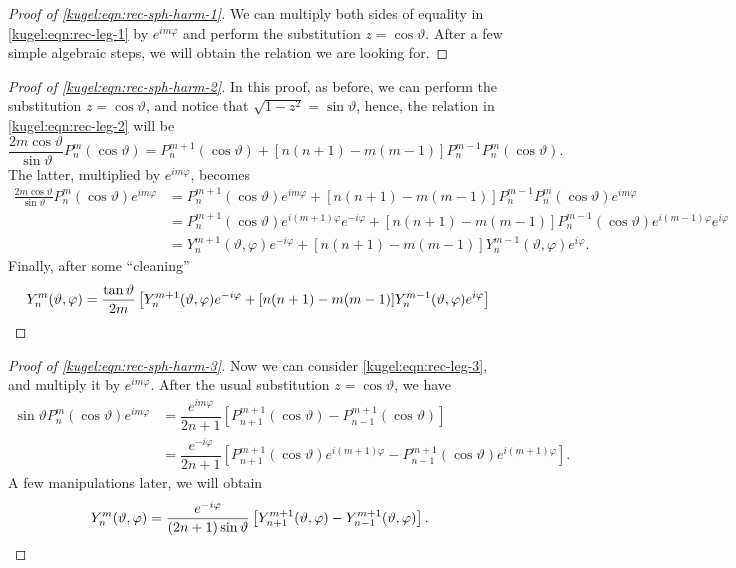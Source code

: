 \begin{proof}[Proof of \eqref{kugel:eqn:rec-sph-harm-1}]
  We can multiply both sides of equality in \eqref{kugel:eqn:rec-leg-1} by $e^{im
  \varphi}$ and perform the substitution $z=\cos \vartheta$. After a few simple
  algebraic steps, we will obtain the relation we are looking for.
\end{proof}

\begin{proof}[Proof of \eqref{kugel:eqn:rec-sph-harm-2}]
  In this proof, as before, we can perform the substitution $z=\cos \vartheta$,
  and notice that $\sqrt{1-z^2}=\sin \vartheta$, hence, the relation in
  \eqref{kugel:eqn:rec-leg-2} will be
  \begin{equation*}
    \frac{2m \cos \vartheta}{\sin \vartheta} P^m_n(\cos \vartheta) 
    = P^{m+1}_n(\cos \vartheta) + [n(n+1)-m(m-1)]P^{m-1}_n P^m_n(\cos \vartheta).
  \end{equation*}
  The latter, multiplied by $e^{im\varphi}$, becomes
  \begin{align*}
    \frac{2m \cos \vartheta}{\sin \vartheta} P^m_n(\cos \vartheta)e^{im\varphi}
      &= P^{m+1}_n(\cos \vartheta)e^{im\varphi}
       + [n(n+1)-m(m-1)]P^{m-1}_n P^m_n(\cos \vartheta)e^{im\varphi} \\
      &= P^{m+1}_n(\cos \vartheta)e^{i(m+1)\varphi}e^{-i\varphi}
       + [n(n+1)-m(m-1)]P^{m-1}_n (\cos \vartheta)e^{i(m-1)\varphi}e^{i\varphi} \\
      &= Y^{m+1}_n(\vartheta, \varphi)e^{-i\varphi}
       + [n(n+1)-m(m-1)]Y^{m-1}_n(\vartheta, \varphi)e^{i\varphi}.
  \end{align*}
  Finally, after some ``cleaning''
  \begin{equation*}
    Y^m_n(\vartheta, \varphi) = \frac{\tan \vartheta}{2m} \left[
      Y^{m+1}_n(\vartheta, \varphi)e^{-i\varphi}
      + [n(n+1)-m(m-1)]Y^{m-1}_n(\vartheta, \varphi)e^{i\varphi}
    \right]
    \qedhere
  \end{equation*}
\end{proof}

\begin{proof}[Proof of \eqref{kugel:eqn:rec-sph-harm-3}]
  Now we can consider \eqref{kugel:eqn:rec-leg-3}, and multiply it by
  $e^{im\varphi}$. After the usual substitution $z=\cos \vartheta$, we have 
  \begin{align*}
    \sin \vartheta P^m_n(\cos \vartheta)e^{im\varphi}
      &= \dfrac{e^{im\varphi}}{2n+1}\left[
          P^{m+1}_{n+1}(\cos \vartheta)
          - P^{m+1}_{n-1}(\cos \vartheta)
        \right] \\
      &= \dfrac{e^{-i\varphi}}{2n+1}\left[
          P^{m+1}_{n+1}(\cos \vartheta)e^{i(m+1)\varphi}
          - P^{m+1}_{n-1}(\cos \vartheta)e^{i(m+1)\varphi}
        \right].
  \end{align*}
  A few manipulations later, we will obtain
  \begin{equation*}
    Y^m_n(\vartheta, \varphi) = \frac{e^{-i\varphi}}{(2n+1)\sin \vartheta}
      \left[
        Y^{m+1}_{n+1}(\vartheta, \varphi)-Y^{m+1}_{n-1}(\vartheta, \varphi)
      \right].
    \qedhere
  \end{equation*}
\end{proof}

